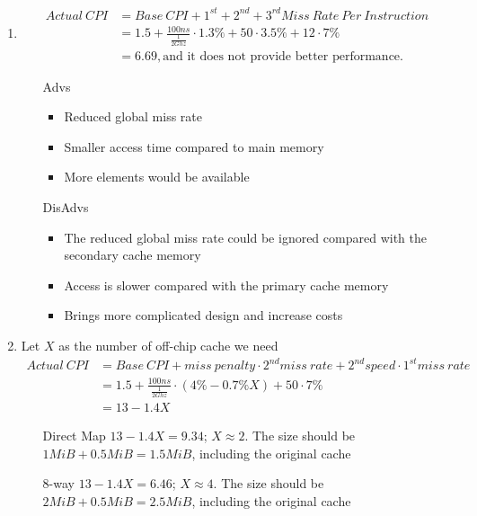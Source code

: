 \documentclass{article}
\def\math#1{$#1$}
\begin{document}
\begin{enumerate}[1)]
\begin{enumerate}
        \end{enumerate}
    \item
        \begin{equation}
            \begin{split}
                Actual\:CPI &= Base\:CPI + 1^{st} + 2^{nd} + 3^{rd} Miss\:Rate\:Per\:Instruction \\
                &= 1.5 + \frac{100ns}{\frac{1}{2Ghz}} \cdot 1.3\% + 50 \cdot 3.5\% + 12 \cdot 7\% \\
                &= 6.69, \text{and it does not provide better performance.}
            \end{split}
        \end{equation}
        \begin{itemize}
            \item [Advs]
                \begin{itemize}
                    \item Reduced global miss rate
                    \item Smaller access time compared to main memory
                    \item More elements would be available 
                \end{itemize}
            \item [DisAdvs]
                \begin{itemize}
                    \item The reduced global miss rate could be ignored compared with the secondary cache memory
                    \item Access is slower compared with the primary cache memory
                    \item Brings more complicated design and increase costs
                \end{itemize}
        \end{itemize}
    \item Let \math{X} as the number of off-chip cache we need
        \begin{equation}
            \begin{split}
                 Actual\:CPI &= Base\:CPI + miss\:penalty \cdot 2^{nd} miss\:rate + 2^{nd} speed \cdot 1^{st} miss\:rate \\
                 &= 1.5 + \frac{100ns}{\frac{1}{2Ghz}} \cdot (4\% - 0.7\% X) + 50 \cdot 7\% \\
                 &= 13- 1.4X
            \end{split}
        \end{equation}
        \begin{itemize}
            \item [Direct Map] \math{13 - 1.4X = 9.34}; \math{X \approx 2}. The size should be \math{1MiB + 0.5 MiB = 1.5MiB}, including the original cache
            \item [8-way] \math{13 - 1.4X = 6.46}; \math{X \approx 4}. The size should be \math{2MiB + 0.5 MiB = 2.5MiB}, including the original cache
        \end{itemize}
\end{enumerate}
\end{document}
